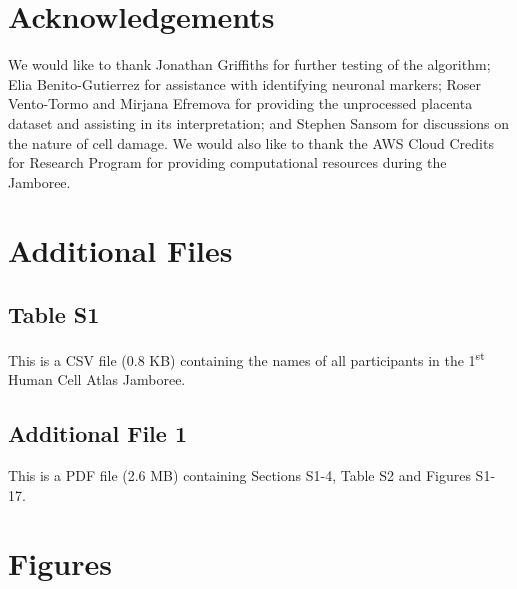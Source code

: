 \documentclass{bmcart}
\begin{document}
\section*{Acknowledgements}
We would like to thank Jonathan Griffiths for further testing of the algorithm;
Elia Benito-Gutierrez for assistance with identifying neuronal markers;
Roser Vento-Tormo and Mirjana Efremova for providing the unprocessed placenta dataset and assisting in its interpretation;
and Stephen Sansom for discussions on the nature of cell damage.
We would also like to thank the AWS Cloud Credits for Research Program for providing computational resources during the Jamboree.


\section*{Additional Files}
\subsection*{Table S1}
This is a CSV file (0.8 KB) containing the names of all participants in the 1\textsuperscript{st} Human Cell Atlas Jamboree.

\subsection*{Additional File 1}
This is a PDF file (2.6 MB) containing Sections S1-4, Table S2 and Figures S1-17.

 



\section*{Figures}
\end{document}
